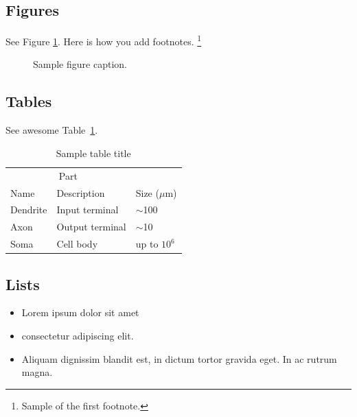 \documentclass{article}
\begin{document}
\subsection{Figures}
\lipsum[10] 
See Figure \ref{fig:fig1}. Here is how you add footnotes. \footnote{Sample of the first footnote.}
\lipsum[11] 

\begin{figure}
  \centering
  \fbox{\rule[-.5cm]{4cm}{4cm} \rule[-.5cm]{4cm}{0cm}}
  \caption{Sample figure caption.}
  \label{fig:fig1}
\end{figure}

\subsection{Tables}
\lipsum[12]
See awesome Table~\ref{tab:table}.

\begin{table}
 \caption{Sample table title}
  \centering
  \begin{tabular}{lll}
    \toprule
    \multicolumn{2}{c}{Part}                   \\
    \cmidrule(r){1-2}
    Name     & Description     & Size ($\mu$m) \\
    \midrule
    Dendrite & Input terminal  & $\sim$100     \\
    Axon     & Output terminal & $\sim$10      \\
    Soma     & Cell body       & up to $10^6$  \\
    \bottomrule
  \end{tabular}
  \label{tab:table}
\end{table}

\subsection{Lists}
\begin{itemize}
\item Lorem ipsum dolor sit amet
\item consectetur adipiscing elit. 
\item Aliquam dignissim blandit est, in dictum tortor gravida eget. In ac rutrum magna.
\end{itemize}


  
\end{document}
